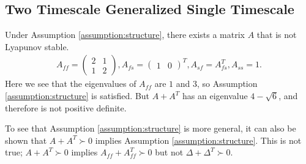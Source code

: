 \subsection{Two Timescale Generalized Single Timescale}
Under Assumption \ref{assumption:structure}, there exists a matrix $A$ that is not Lyapunov stable. 
\begin{align*}
    A_{ff} = \begin{pmatrix}
        2 & 1 \\ 1 & 2
    \end{pmatrix} ,
    A_{fs} = \begin{pmatrix}
        1 & 0
    \end{pmatrix}^T , 
    A_{sf} = A_{fs}^T, 
    A_{ss} = 1 .
\end{align*}
Here we see that the eigenvalues of $A_{ff}$ are $1$ and $3$, so Assumption \ref{assumption:structure} is satisfied. 
But $A + A^T$ has an eigenvalue $4 - \sqrt{6}$, and therefore is not positive definite. 


To see that Assumption \ref{assumption:structure} is more general, it can also be shown that $A + A^T \succ 0$ implies Assumption \ref{assumption:structure}.
{\color{red}This is not true; $A + A^T \succ 0$ implies $A_{ff} + A_{ff}^T \succ 0$ but not $\Delta + \Delta^T \succ 0$.}






